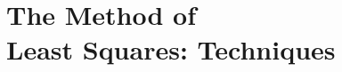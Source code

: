 \chapter[The Method of Least Squares: Techniques]{The Method of \\Least Squares: Techniques}






%

\endinput